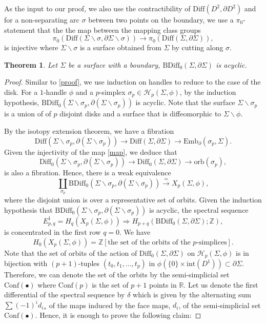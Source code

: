 \documentclass[a4paper]{amsart}
\newtheorem{thm}{Theorem}[section]
\theoremstyle{definition}
\theoremstyle{remark}
\newcommand{\bR}{\mathbb{R}}
\newcommand{\bZ}{\mathbb{Z}}
\newcommand\Diff{\mathrm{Diff}}
\newcommand\BDiff{\mathrm{BDiff}}
\numberwithin{equation}{section}
\begin{document}
As the input to our proof, we also use the contractibility of $\Diff(D^2,\partial D^2)$ and for a non-separating arc $\sigma$ between two points on the boundary, we use a $\pi_0$-statement that the the map between the mapping class groups
\begin{equation}\label{map}
\pi_0(\Diff(\Sigma\backslash \sigma, \partial \Sigma\backslash \sigma)) \to \pi_0(\Diff(\Sigma,\partial\Sigma)),
\end{equation}
is injective where $\Sigma\backslash \sigma$ is a surface obtained from $\Sigma$ by cutting along $\sigma$. 
 
\begin{thm}\label{surface}
Let $\Sigma$ be a surface with a boundary, $\BDiff_0(\Sigma,\partial \Sigma)$ is acyclic. 
\end{thm}
\begin{proof}
Similar to \cref{proof}, we use induction on handles to reduce to the case of the disk. For a $1$-handle $\phi$ and a $p$-simplex $\sigma_p\in \mathcal{H}_{p}(\Sigma,\phi)$, by the induction hypothesis, $\BDiff_0(\Sigma\backslash \sigma_p,\partial (\Sigma\backslash \sigma_p))$ is acyclic. Note that the surface $\Sigma\backslash \sigma_p$ is a union of of $p$ disjoint disks and a surface that is diffeomorphic to $\Sigma\backslash \phi$.

 By the isotopy extension theorem, we have a fibration
\[
\Diff(\Sigma\backslash \sigma_p,\partial (\Sigma\backslash \sigma_p))\to \Diff(\Sigma,\partial \Sigma)\to \text{Emb}_{\partial}(\sigma_p,\Sigma). 
\]
Given  the injectivity of the map \ref{map}, we deduce that 
\[
\Diff_0(\Sigma\backslash \sigma_p,\partial (\Sigma\backslash \sigma_p))\to \Diff_0(\Sigma,\partial \Sigma)\to \text{orb}(\sigma_p),
\]
is also a fibration. Hence, there is a weak equivalence  $$\coprod_{\sigma_p}\BDiff_0(\Sigma\backslash \sigma_p,\partial (\Sigma\backslash \sigma_p))\xrightarrow{\simeq}X_p(\Sigma, \phi),$$ where the disjoint union is over a representative set of orbits.
Given the induction hypothesis that $\BDiff_0(\Sigma\backslash \sigma_p,\partial (\Sigma\backslash \sigma_p))$ is acyclic, the spectral sequence
\[
E^1_{p,q}=H_q(X_p(\Sigma,\phi))\Rightarrow H_{p+q}(\BDiff_0(\Sigma,\partial\Sigma);\bZ),
\]
is concentrated in the first row $q=0$. We have $$H_0(X_p(\Sigma,\phi))= \bZ[\text{the set of the orbits of the $p$-simplices}].$$
Note that the set of orbits of the action of $\Diff_0(\Sigma,\partial \Sigma)$ on $\mathcal{H}_{p}(\Sigma,\phi)$ is in bijection with $(p+1)$-tuples $(t_0,t_1,\dots,t_p)$ in $\phi(\{0\}\times \text{int}(D^1))\subset \partial\Sigma$. Therefore, we can denote the set of the orbits by the semi-simplicial set $\text{Conf}(\bullet)$ where $\text{Conf}(p)$ is the set of $p+1$ points in $\bR$. Let us denote the first differential of the spectral sequence by $\delta$ which is given by the alternating sum $\sum (-1)^i {d_i}_*$ of the maps induced by the face maps, $d_i$, of the semi-simplicial set $\text{Conf}(\bullet)$. Hence, it is enough to prove the following claim:


\end{proof}
\end{document}
